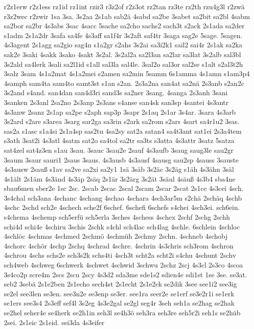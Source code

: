{r2z1erw
r2z1ess
rz1id
rz1int
rzir3
r3z2of
r2z3ot
rz2tan
rz3te
rz2th
rzu4g3l
r2zwä
r3z2wec
r2zwir
1sa
3sa.
3s2aa
2s1ab
sab2ä
4sabd
sa2be
3sabet
sa2bit
sa2bl
4sabm
sa2bor
sa2br
4s3abs
3sac
4sacc
5sache
sa2cho
sachs2
sach3t
s2ack
2s1ada
sa2der
s1adm
2s1a2dr
3safa
sa4fe
4s3aff
sa1f4r
3s2aft
saf4tr
3saga
sag2e
5sage.
5sagen.
4s3agent
2s1agg
sa2gio
sag4n
s1a2gr
s2ahs
3s2ai
sa3i2k1
sail2
sai4r
2s1ak
sa2ka
sak2e
3saki
4sakk
3sako
4sakt
3s2al.
3s2al2a
sa2l3an
sa2lar
sa3lat
3s2alb
sal3bl
3s2ald
sa4lerk
3sali
sa2l1id
s1all
sal3la
sal4le.
3sal2o
sal3or
sal2se
s1alt
s2al3t2h
3salz
3sam
4s1a2mat
4s1a2mei
s2amen
sa2min
5samm
6s1amma
4s1amn
s1am3p4
4samph
sam4ta
sam4to
samt3st
s1an
s2an.
2s3a2na
san4at
sa2nä
2s3anb
s2an2c
3s2and
s4and.
san4dan
san4d3ri
sand3s
sa2ner
3sang.
4sanga
2s3anh
3sani
3sanken
2s3anl
2sa2no
2s3anp
2s3ans
s4anse
san4sk
san3sp
4santei
4s3antr
4s3anw
2sanz
2s1ap
sa2pe
s2aph
sap3p
3sapr
2s1aq
2s1ar
3s4ar.
3sara
4s3arb
3s2ard
s2are
s3area
3sarg
sar2ga
sa3rin
s2ark
sa2rom
s2ars
4sart
sa4r1u2
3sas.
sas2a
s1asc
s1a4si
2s1a4sp
sas2tu
4sa2sy
sat2a
satan4
sa4t3ant
sat1ei
2s3a4tem
s3ath
3sat2i
4s3atl
4satm
sat2o
sa4tol
sa2tr
sa3ts
s3atta
4s3attr
3satz
5satza
sat4zel
sat4z3en
s1au
3sau.
3sauc
3sau2e
2sauf
4s3aufb
3saug
saug3le
sau2gr
3saum
3saur
sauri1
2saus
3saus.
4s3ausb
4s3ausf
4sausg
sau2sp
4sauss
3sauste
4s3ausw
2sauß
s1av
sa2ve
sa2xi
sa2y1
1sä
3säb
3s2äc
3s2äg
s1äh
4s3ähn
3säl
4s1ält
2s1äm
4s3änd
4s3äp
2säq
2s1är
3s2ärg
3s2ät
3säul
4säuß
4s3b4
sba4ne
sbau6men
sber2e
1sc
2sc.
2scab
2scac
2scal
2scam
2scar
2scat
2s1ce
4s3cei
4sch.
3s4chal
sch3ana
4schanc
4schang
4schao
4schara
4sch3ar5m
s2chä
2schäq
4schb
4schc
2schd
sch2e
4schech
sche2f
6schef.
6schefi
6schefs
s4chei
4sch3ei.
sch6ein.
s4chema
4schemp
sch5erfü
sch5erla
3sches
4schess
4schex
2schf
2schg
2schh
schi4d
schi4e
4schiru
3schis
2schk
s4chl
sch4lac
sch4lag
4schle.
6schlein
4schloc
4schlöc
4schmas
4schmed
2schmö
4schmüh
2schmy
2schn.
4schneb
4schobj
4schorc
4schör
4schp
2schq
4schrad
4schre.
4schrin
4s3chris
sch3rom
4schron
4schrou
4schs
schs2e
sch3s2k
schs4ti
4sch3t
scht2a
scht2i
s4chu
4schunt
2schv
sch4web
4schweg
6schwerk
4schwet
4schwid
3schwu
2schz
2scj
4s3cl
2s3co
4scoa
3s4co2p
scre4m
2scs
2scu
2scy
4s3d2
sda3me
sde1s2
sdien4e
sdi1st
1se
3se.
se3at.
seb2
3sebä
2s1e2ben
2s1echo
sech4st
2s1echt
2s1e2ck
se2dik
3see
see1i2
see3ig
se2el
see3len
se3en.
see3n2e
se3enp
se3er.
see1ra
seer2e
se1erf
se3e2r1i
se1erk
se1ers
see3s4
2s3eff
sef4l
3s2eg
4s3e2gal
se2gl
seg4r
3seh
seh1a
se2hag
se2hak
se2hel
seher4e
se4herk
se2h1in
seh3l
se4h3ö
seh3ra
seh3re
seh5r2i
seh1s
se2hüb
2sei.
2s1eic
2s1eid.
sei3da
4s3eifer
}
